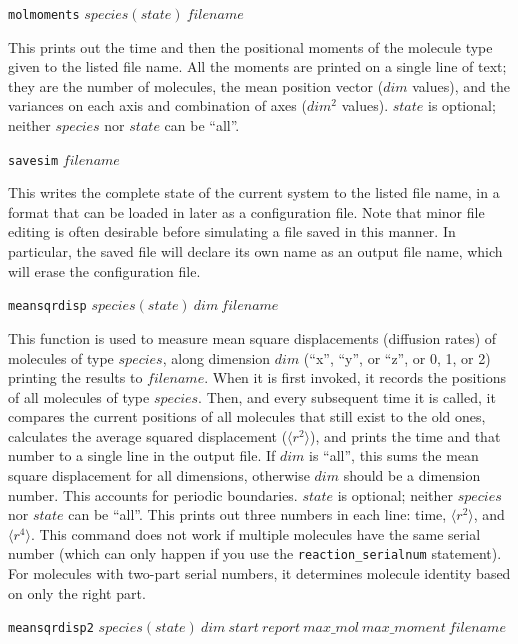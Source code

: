 \documentclass {scrbook}
\newcommand {\ttt} {\texttt}
\begin{document}
\begin{description}
\item{\ttt{molmoments} $species(state)\ filename$}

This prints out the time and then the positional moments of the molecule type given to the listed file name. All the moments are printed on a single line of text; they are the number of molecules, the mean position vector ($dim$ values), and the variances on each axis and combination of axes ($dim^2$ values). $state$ is optional; neither $species$ nor $state$ can be ``all''.

\item{\ttt{savesim} $filename$}

This writes the complete state of the current system to the listed file name, in a format that can be loaded in later as a configuration file. Note that minor file editing is often desirable before simulating a file saved in this manner. In particular, the saved file will declare its own name as an output file name, which will erase the configuration file.

\item{\ttt{meansqrdisp} $species(state)\ dim\ filename$}

This function is used to measure mean square displacements (diffusion rates) of molecules of type $species$, along dimension $dim$ (``x'', ``y'', or ``z'', or 0, 1, or 2) printing the results to $filename$. When it is first invoked, it records the positions of all molecules of type $species$. Then, and every subsequent time it is called, it compares the current positions of all molecules that still exist to the old ones, calculates the average squared displacement ($\langle r^2 \rangle$), and prints the time and that number to a single line in the output file. If $dim$ is ``all'', this sums the mean square displacement for all dimensions, otherwise $dim$ should be a dimension number. This accounts for periodic boundaries. $state$ is optional; neither $species$ nor $state$ can be ``all''. This prints out three numbers in each line: time, $\langle r^2 \rangle$, and $\langle r^4 \rangle$. This command does not work if multiple molecules have the same serial number (which can only happen if you use the \ttt{reaction\_serialnum} statement). For molecules with two-part serial numbers, it determines molecule identity based on only the right part.

\item{\ttt{meansqrdisp2} $species(state)\ dim\ start\ report\ max\_mol\ max\_moment\ filename$}


\end{description}
\end{document}

